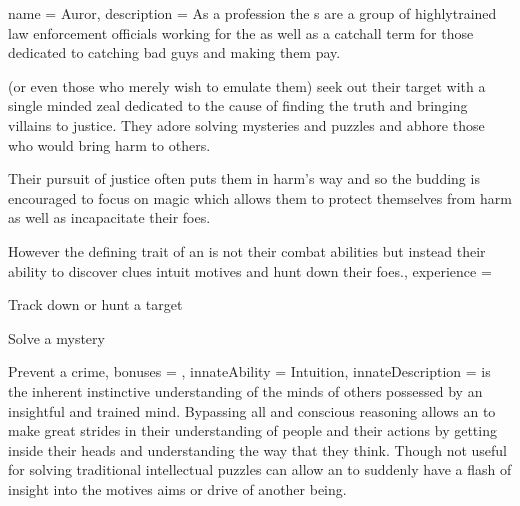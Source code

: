 \archetype
{
	name = Auror,
	description = As a profession\comma{} the \auror{}s are a group of highly\minus{}trained law enforcement officials working for the \comma{} as well as a catchall term for those dedicated to catching bad guys and making them pay.

 (or even those who merely wish to emulate them) seek out their target with a single minded zeal\comma{} dedicated to the cause of finding the truth and bringing villains to justice. They adore solving mysteries and puzzles\comma{} and abhore those who would bring harm to others. 

Their pursuit of justice often puts them in harm's way\comma{} and so the budding \auror{} is encouraged to focus on magic which allows them to protect themselves from harm\comma{} as well as incapacitate their foes. 

However\comma{} the defining trait of an \auror{} is not their combat abilities but instead their ability to discover clues\comma{} intuit motives and hunt down their foes.,
	experience = \item Track down or hunt a target
\item Solve a mystery 
\item Prevent a crime,
	bonuses = 
,
	innateAbility = Intuition,
	innateDescription = \imp{\innateAbility} is the inherent\comma{} instinctive understanding of the minds of others possessed by an insightful and trained mind. Bypassing all  and conscious reasoning\comma{}  allows an \name{} to make great strides in their understanding of people and their actions by getting inside their heads and understanding the way that they think. Though not useful for solving traditional intellectual puzzles\comma{} \imp{\innateAbility} can allow an \imp{\name} to suddenly have a flash of insight into the motives\comma{} aims or drive of another being. 

}
